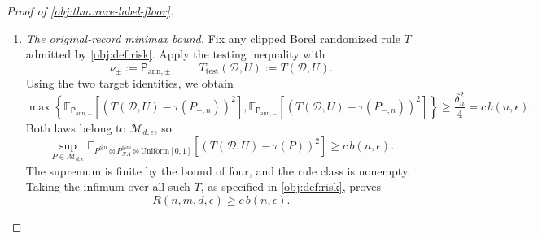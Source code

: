 \documentclass[11pt]{article}
\begin{document}
\begin{proof}[Proof of \cref{obj:thm:rare-label-floor}]
\begin{enumerate}
\item \textit{The original-record minimax bound.}
Fix any clipped Borel randomized rule \(T\) admitted by
\cref{obj:def:risk}. Apply the testing inequality with
\[
\nu_\pm:=\mathsf P_{\mathrm{ann},\pm},
\qquad
T_{\mathrm{test}}(\mathcal D,U):=T(\mathcal D,U).
\]
Using the two target identities, we obtain
\[
\max\left\{
\mathbb E_{\mathsf P_{\mathrm{ann},+}}
[(T(\mathcal D,U)-\tau(P_{+,n}))^2],
\mathbb E_{\mathsf P_{\mathrm{ann},-}}
[(T(\mathcal D,U)-\tau(P_{-,n}))^2]
\right\}
\ge\frac{\delta_n^2}{4}
=c\,b(n,\epsilon).
\]
Both laws belong to \(\mathcal M_{d,\epsilon}\), so
\[
\sup_{P\in\mathcal M_{d,\epsilon}}
\mathbb E_{P^{\otimes n}\otimes P_{XA}^{\otimes m}
                   \otimes\mathrm{Uniform}[0,1]}
[(T(\mathcal D,U)-\tau(P))^2]
\ge c\,b(n,\epsilon).
\]
The supremum is finite by the bound of four, and the rule class is
nonempty. Taking the infimum over all such \(T\), as specified in
\cref{obj:def:risk}, proves
\[
R(n,m,d,\epsilon)\ge c\,b(n,\epsilon).
\]


\end{enumerate}
\end{proof}
\end{document}
